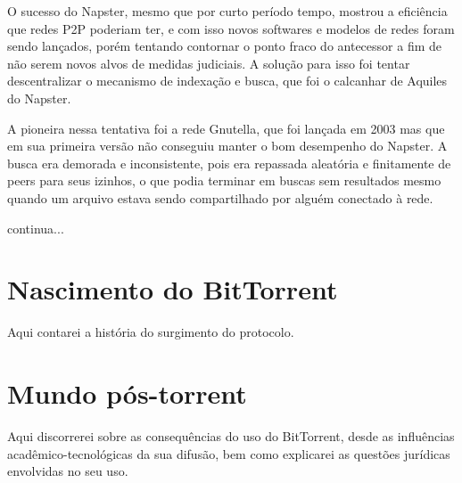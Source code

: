 O sucesso do Napster, mesmo que por curto período tempo, mostrou a eficiência que redes
P2P poderiam ter, e com isso novos softwares e modelos de redes foram sendo lançados,
porém tentando contornar o ponto fraco do antecessor a fim de não serem novos alvos de
medidas judiciais. A solução para isso foi tentar descentralizar o mecanismo de indexação
e busca, que foi o calcanhar de Aquiles do Napster.

A pioneira nessa tentativa foi a rede Gnutella, que foi lançada em 2003 mas que em sua
primeira versão não conseguiu manter o bom desempenho do Napster. A busca era demorada e
inconsistente, pois era repassada aleatória e finitamente de peers para seus izinhos, o
que podia terminar em buscas sem resultados mesmo quando um arquivo estava sendo
compartilhado por alguém conectado à rede.

continua...

\section{Nascimento do BitTorrent}

Aqui contarei a história do surgimento do protocolo.

\section{Mundo pós-torrent}

Aqui discorrerei sobre as consequências do uso do BitTorrent, desde as influências acadêmico-tecnológicas da sua difusão, bem como explicarei as questões jurídicas envolvidas no seu uso.

\clearpage
